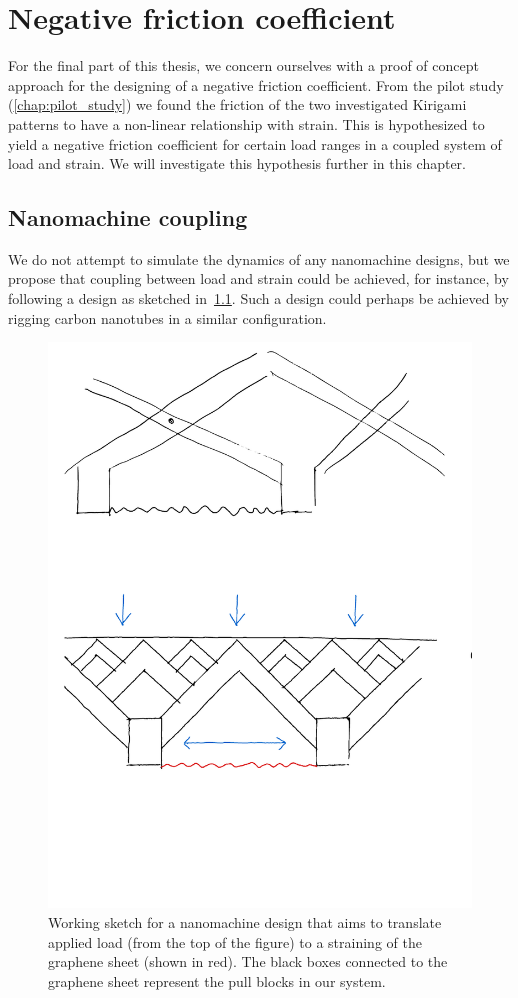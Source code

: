 \chapter{Negative friction coefficient}\label{chap:negative_coef}
For the final part of this thesis, we concern ourselves with a proof of concept approach for the designing of a negative friction coefficient. From the pilot study (\cref{chap:pilot_study}) we found the friction of the two investigated Kirigami patterns to have a non-linear relationship with strain. This is hypothesized to yield a negative friction coefficient for certain load ranges in a coupled system of load and strain. We will investigate this hypothesis further in this chapter.

\section{Nanomachine coupling}
We do not attempt to simulate the dynamics of any nanomachine designs, but we propose that coupling between load and strain could be achieved, for instance, by following a design as sketched in~\cref{fig:nanomachine}. Such a design could perhaps be achieved by rigging carbon nanotubes in a similar configuration. 

\begin{figure}[H]
  \centering
  \includegraphics[width=0.5\linewidth]{figures/negative_coefficient/nanomachine.pdf}
  \caption{Working sketch for a nanomachine design that aims to translate applied load (from the top of the figure) to a straining of the graphene sheet (shown in red). The black boxes connected to the graphene sheet represent the pull blocks in our system.}
  \label{fig:nanomachine}
\end{figure}

